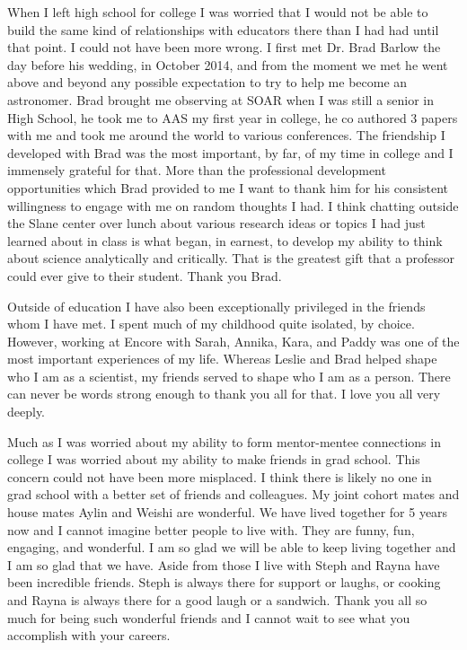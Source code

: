When I left high school for college I was worried that I would not be able to
build the same kind of relationships with educators there than I had had
until that point. I could not have been more wrong. I first met Dr. Brad Barlow
the day before his wedding, in October 2014, and from the moment we met he went
above and beyond any possible expectation to try to help me become an astronomer.
Brad brought me observing at SOAR when I was still a senior in High School, he
took me to AAS my first year in college, he co authored 3 papers with me and
took me around the world to various conferences. The friendship I developed with
Brad was the most important, by far, of my time in college and I immensely
grateful for that. More than the professional development opportunities which
Brad provided to me I want to thank him for his consistent willingness to
engage with me on random thoughts I had. I think chatting outside the Slane
center over lunch about various research ideas or topics I had just learned
about in class is what began, in earnest, to develop my ability to think about
science analytically and critically. That is the greatest gift that a professor
could ever give to their student. Thank you Brad.

Outside of education I have also been exceptionally privileged in the friends
whom I have met. I spent much of my childhood quite isolated, by choice.
However, working at Encore with Sarah, Annika, Kara, and Paddy was one of the
most important experiences of my life. Whereas Leslie and Brad helped shape who
I am as a scientist, my friends served to shape who I am as a person. There can
never be words strong enough to thank you all for that. I love you all very
deeply. 

Much as I was worried about my ability to form mentor-mentee connections in
college I was worried about my ability to make friends in grad school. This
concern could not have been more misplaced. I think there is likely no one in
grad school with a better set of friends and colleagues. My joint cohort mates
and house mates Aylin and Weishi are wonderful. We have lived together for 5
years now and I cannot imagine better people to live with. They are funny, fun,
engaging, and wonderful. I am so glad we will be able to keep living together
and I am so glad that we have. Aside from those I live with Steph and Rayna
have been incredible friends. Steph is always there for support or laughs, or
cooking and Rayna is always there for a good laugh or a sandwich. Thank you
all so much for being such wonderful friends and I cannot wait to see what you
accomplish with your careers.

